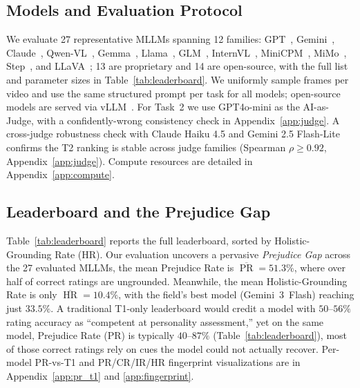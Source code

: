 \documentclass{article}
\newcommand{\gapinv}{Prejudice Gap}
\begin{document}
\subsection{Models and Evaluation Protocol}
\label{sec:setup}

We evaluate 27 representative MLLMs spanning 12 families: GPT~\cite{openai2023gpt4,openai2024gpt4o,openai2025gpt5,openai2025gpt55,openai2025gpt54,openai2025gpt54mini,openai2025o4mini}, Gemini~\cite{anil2023gemini,reid2024gemini15,comanici2025gemini,google2025gemini3,google2025gemini3flash,google2025gemini31pro}, Claude~\cite{anthropic2024claude3,anthropic2025claudeopus46,anthropic2025claudesonnet46,anthropic2025claudehaiku45}, Qwen-VL~\cite{bai2023qwen,wang2024qwen2vl,bai2025qwen25vl,xu2025qwen3,qwen2025qwen3}, Gemma~\cite{deepmind2025gemma4}, Llama~\cite{meta2025llama4maverick}, GLM~\cite{glm2024chatglm,hong2025glm}, InternVL~\cite{chen2024internvl}, MiniCPM~\cite{yao2024minicpmv}, MiMo~\cite{li2025mimo}, Step~\cite{huang2026step3vl}, and LLaVA~\cite{liu2023llava,liu2024llava15}; 13 are proprietary and 14 are open-source, with the full list and parameter sizes in Table~\ref{tab:leaderboard}. We uniformly sample frames per video and use the same structured prompt per task for all models; open-source models are served via vLLM~\cite{kwon2023vllm}. For Task~2 we use GPT4o-mini as the AI-as-Judge, with a confidently-wrong consistency check in Appendix~\ref{app:judge}. A cross-judge robustness check with Claude Haiku 4.5 and Gemini 2.5 Flash-Lite confirms the T2 ranking is stable across judge families (Spearman $\rho \geq 0.92$, Appendix~\ref{app:judge}). Compute resources are detailed in Appendix~\ref{app:compute}.

\subsection{Leaderboard and the Prejudice Gap}
\label{sec:leaderboard}\label{sec:gap_inversion}

Table~\ref{tab:leaderboard} reports the full leaderboard, sorted by Holistic-Grounding Rate (HR). Our evaluation uncovers a pervasive \emph{\gapinv{}} across the 27 evaluated MLLMs, the mean Prejudice Rate is $\overline{\operatorname{PR}}\!=\!51.3\%$, where over half of correct ratings are ungrounded. Meanwhile, the mean Holistic-Grounding Rate is only $\overline{\operatorname{HR}}\!=\!10.4\%$, with the field's best model (Gemini~3~Flash) reaching just $33.5\%$. A traditional T1-only leaderboard would credit a model with $50$--$56\%$ rating accuracy as ``competent at personality assessment,'' yet on the same model, Prejudice Rate (PR) is typically $40$--$87\%$ (Table~\ref{tab:leaderboard}), most of those correct ratings rely on cues the model could not actually recover. Per-model PR-vs-T1 and PR/CR/IR/HR fingerprint visualizations are in Appendix~\ref{app:pr_t1} and \ref{app:fingerprint}.
\end{document}
